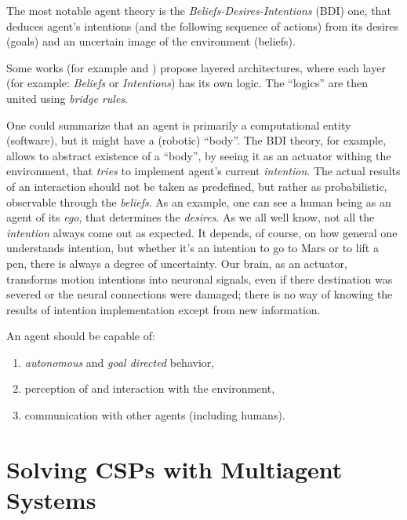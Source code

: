 \documentclass[ThesisDoc]{subfiles}
\begin{document}
The most notable agent theory is the \emph{Beliefs-Desires-Intentions} (BDI) one,
that deduces agent's intentions (and the following sequence of actions)
from its desires (goals) and an uncertain image of the environment (beliefs).


Some works (for example \cite{UAB-Thesis} and \cite{PNoriega}) propose
layered architectures, where each layer (for example: \emph{Beliefs} or \emph{Intentions})
has its own logic. The ``logics'' are then united using \emph{bridge rules}.



\medskip

\noindent
One could summarize that an agent is primarily a computational entity (software),
but it might have a (robotic) ``body''.
The BDI theory, for example, allows to abstract existence of a ``body'',
by seeing it as an actuator withing the environment, that \emph{tries} to
implement agent's current \emph{intention}.
The actual results of an interaction should not be taken as predefined, but rather
as probabilistic, observable through the \emph{beliefs}. As an example, one can
see a human being as an agent of its \emph{ego}, that determines the \emph{desires}.
As we all well know, not all the \emph{intention} always come out as expected.
It depends, of course, on how general one understands intention, but whether
it's an intention to go to Mars or to lift a pen, there is always a degree of
uncertainty. Our brain, as an actuator, transforms motion intentions into
neuronal signals, even if there destination was severed or the neural connections
were damaged; there is no way of knowing the results of intention implementation
except from new information.

\bigskip

\noindent
An agent should be capable of:
\begin{enumerate}
  \item \emph{autonomous} and \emph{goal directed} behavior,
  \item perception of and interaction with the environment,
  \item communication with other agents (including humans).
\end{enumerate}


\section{Solving CSPs with Multiagent Systems}
\label{sec:CSP-Agents}
\end{document}
